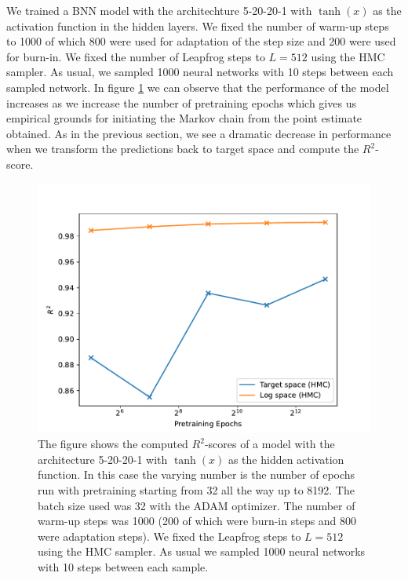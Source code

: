 We trained a BNN model with the architechture 5-20-20-1 with $\tanh(x)$ as the activation function in the hidden layers. We fixed the number of warm-up steps to 1000 of which 800 were used for adaptation of the step size and 200 were used for burn-in. We fixed the number of Leapfrog steps to $L = 512$ using the HMC sampler. As usual, we sampled 1000 neural networks with 10 steps between each sampled network. In figure \ref{fig:r2_score_vs_pretraining} we can observe that the performance of the model increases as we increase the number of pretraining epochs which gives us empirical grounds for initiating the Markov chain from the point estimate obtained. As in the previous section, we see a dramatic decrease in performance when we transform the predictions back to target space and compute the $R^2$-score. 
\begin{figure}[H]
    \centering
    \includegraphics[scale=0.7]{figures/r2_scores/r2_score_vs_pretraining.pdf}
    \caption{The figure shows the computed $R^2$-scores of a model with the architecture 5-20-20-1 with $\tanh(x)$ as the
    hidden activation function. In this case the varying number is the number of epochs run with pretraining starting from 32 all the way up to 8192. The batch size used was 32 with the ADAM optimizer. The number of warm-up steps was 1000 (200 of which were burn-in steps and 800 were adaptation steps). We fixed the Leapfrog steps to $L = 512$ using the HMC sampler. As usual we sampled 1000 neural networks with 10 steps between each sample.
    }
    \label{fig:r2_score_vs_pretraining}
\end{figure}

